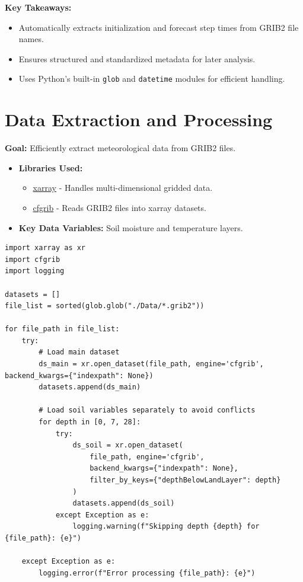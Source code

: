 \documentclass[a4paper,10pt]{article}
\begin{document}
\textbf{Key Takeaways:}
\begin{itemize}
    \item Automatically extracts initialization and forecast step times from GRIB2 file names.
    \item Ensures structured and standardized metadata for later analysis.
    \item Uses Python’s built-in \texttt{glob} and \texttt{datetime} modules for efficient handling.
\end{itemize}

\section{Data Extraction and Processing}
\textbf{Goal:} Efficiently extract meteorological data from GRIB2 files.

\begin{itemize}
    \item \textbf{Libraries Used:}
    \begin{itemize}
        \item \href{https://xarray.pydata.org/en/stable/}{xarray} - Handles multi-dimensional gridded data.
        \item \href{https://github.com/ecmwf/cfgrib}{cfgrib} - Reads GRIB2 files into xarray datasets.
    \end{itemize}
    \item \textbf{Key Data Variables:} Soil moisture and temperature layers.
\end{itemize}

\begin{verbatim}
import xarray as xr
import cfgrib
import logging

datasets = []
file_list = sorted(glob.glob("./Data/*.grib2"))

for file_path in file_list:
    try:
        # Load main dataset
        ds_main = xr.open_dataset(file_path, engine='cfgrib', backend_kwargs={"indexpath": None})
        datasets.append(ds_main)

        # Load soil variables separately to avoid conflicts
        for depth in [0, 7, 28]:
            try:
                ds_soil = xr.open_dataset(
                    file_path, engine='cfgrib',
                    backend_kwargs={"indexpath": None},
                    filter_by_keys={"depthBelowLandLayer": depth}
                )
                datasets.append(ds_soil)
            except Exception as e:
                logging.warning(f"Skipping depth {depth} for {file_path}: {e}")

    except Exception as e:
        logging.error(f"Error processing {file_path}: {e}")
\end{verbatim}
\end{document}
